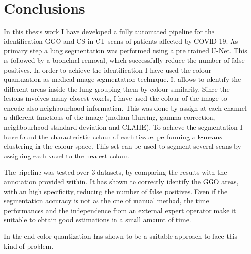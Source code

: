 \documentclass{standalone}
\begin{document}
	\chapter*{Conclusions}
	
	In this thesis work I have developed a fully automated pipeline for the identification GGO and CS in CT scans of patients affected by COVID-19.
	As primary step a lung segmentation was performed using a pre trained U-Net. This is followed by a bronchial removal, which successfully reduce the number of false positives.  
	In order to achieve the identification I have used the colour quantization as medical image segmentation technique.  It allows to identify the different areas inside the lung grouping them by colour similarity. Since the lesions involves many closest voxels, I have used the colour of the image to encode also neighbourhood information. This was done by assign at each channel a different functions of the image (median blurring, gamma correction, neighbourhood standard deviation and CLAHE). To achieve the segmentation I have found the characteristic colour of each tissue, performing a k-means clustering in the colour space. This set can be used to segment several scans by assigning each voxel to the nearest colour. 
	
	The pipeline was tested over $3$ datasets, by comparing the results with the annotation provided within. It has shown to correctly identify the GGO areas, with an high specificity, reducing the number of false positives. Even if the segmentation accuracy is not as the one of manual method, the time performances and the independence from an external expert operator make it suitable to obtain good estimations in a small amount of time. 

	In the end color quantization has shown to be a suitable approach to face this kind of problem. 
	
\end{document}
